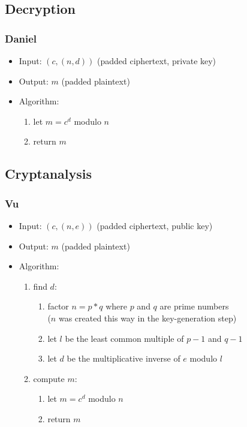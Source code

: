 
\subsection{Decryption}

\begin{frame}
\frametitle{Daniel}
\begin{itemize}
\item Input: $(c, (n, d))$ (padded ciphertext, private key)
\item Output: $m$ (padded plaintext)
\item Algorithm:
  \begin{enumerate}
  \item let $m = c^d$ modulo $n$
  \item return $m$
  \end{enumerate}
\end{itemize}
\end{frame}


\subsection{Cryptanalysis}

\begin{frame}
\frametitle{Vu}
\begin{itemize}
\item Input: $(c, (n, e))$ (padded ciphertext, public key)
\item Output: $m$ (padded plaintext)
\item Algorithm:
  \begin{enumerate}
  \item find $d$:
    \begin{enumerate}
    \item factor $n = p * q$ where
      $p$ and $q$ are prime numbers \\
      ($n$ was created this way in the key-generation step)
    \item let $l$ be the least common multiple of
      $p - 1$ and $q - 1$
    \item let $d$ be the multiplicative inverse of $e$
      modulo $l$
    \end{enumerate}
  \item compute $m$:
    \begin{enumerate}
    \item let $m = c^d$ modulo $n$
    \item return $m$
    \end{enumerate}
  \end{enumerate}
\end{itemize}
\end{frame}

